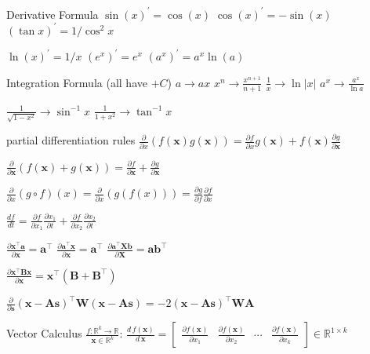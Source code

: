 \documentclass[UTF8,a4paper]{article}
\begin{document}
\begin{multicols}{3}
\begin{cheatsheetblock}{Derivative Formula}
    $\sin(x)^{\prime}=\cos (x)$ \hfill $\cos (x)^{\prime}=-\sin (x)$ \hfill $(\tan x)^{\prime}=1 / \cos ^{2} x$

    $\ln (x)^{\prime}=1 / x$  \hfill $(e^{x})^{\prime}=e^{x}$ \hfill $(a^{x})^{\prime}=a^{x} \ln (a)$
\end{cheatsheetblock}

\begin{cheatsheetblock}{Integration Formula (all have $+C$)}
    $a \to ax$ \hfill $x^n \to \frac{x^{n+1}}{n+1}$ \hfill $\frac{1}{x} \to \ln|x|$ \hfill $a^x \to \frac{a^x}{\ln a}$

    $\frac{1}{\sqrt{1-x^2}} \to \sin^{-1} x$ \hfill $\frac{1}{1+x^2} \to \tan^{-1} x$
\end{cheatsheetblock}


\begin{cheatsheetblock}{partial differentiation rules}
    $\frac{\partial}{\partial x}(f(\boldsymbol{x}) g(\boldsymbol{x}))=\frac{\partial f}{\partial x} g(\boldsymbol{x})+f(\boldsymbol{x}) \frac{\partial g}{\partial \boldsymbol{x}}$ \hfill {}

    $\frac{\partial}{\partial \boldsymbol{x}}(f(\boldsymbol{x})+g(\boldsymbol{x}))=\frac{\partial f}{\partial \boldsymbol{x}}+\frac{\partial g}{\partial \boldsymbol{x}}$ \hfill {}
    
    $\frac{\partial}{\partial x}(g \circ f)(x)=\frac{\partial}{\partial x}(g(f(x)))=\frac{\partial g}{\partial f} \frac{\partial f}{\partial x}$ \hfill {}

    $\frac{d f}{d t}=\frac{\partial f}{\partial x_1} \frac{\partial x_1}{\partial t}+\frac{\partial f}{\partial x_2} \frac{\partial x_2}{\partial t}$     \hfill {}
    
    $\frac{\partial \bm{x}^\top \bm{a}}{\partial \bm{x}} = \bm{a}^\top$ \hfill $\frac{\partial \bm{a}^\top \bm{x}}{\partial \bm{x}} = \bm{a}^\top$ \hfill $\frac{\partial \bm{a}^\top \bm{X} \bm{b}}{\partial \bm{X}} = \bm{a} \bm{b}^\top$

    $\frac{\partial \bm{x}^\top \bm{B} \bm{x}}{\partial \bm{x}} = \bm{x}^\top (\bm{B} + \bm{B}^\top)$

    $\frac{\partial}{\partial \bm{s}} (\bm{x} - \bm{A}\bm{s})^\top \bm{W} (\bm{x} - \bm{A}\bm{s}) = -2 (\bm{x} - \bm{A}\bm{s})^\top \bm{WA}$
\end{cheatsheetblock}

\begin{cheatsheetblock}{Vector Calculus}
    $\frac{f: \mathbb{R}^k \rightarrow \mathbb{R}}{\bm{x} \in \mathbb{R}^k}$: \hfill
    $\frac{d\,f(\bm{x})}{d\,\bm{x}}=\left[\begin{array}{cccc}
                \frac{\partial f(\bm{x})}{\partial x_1} & \frac{\partial f(\bm{x})}{\partial x_2} & \cdots & \frac{\partial f(\bm{x})}{\partial x_k}
            \end{array}\right] \in \mathbb{R}^{1 \times k}$


\end{cheatsheetblock}
\end{multicols}
\end{document}
